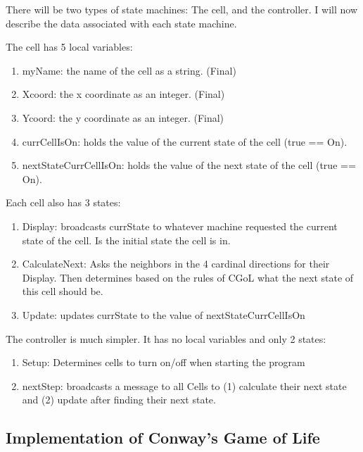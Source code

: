 There will be two types of state machines: The cell, and the controller.
I will now describe the data associated with each state machine.

The cell has 5 local variables:
\begin{enumerate}[leftmargin=4\parindent]
    \item myName: the name of the cell as a string. (Final)
    \item Xcoord: the x coordinate as an integer. (Final)
    \item Ycoord: the y coordinate as an integer. (Final)
    \item currCellIsOn: holds the value of the current state of the cell (true == On).
    \item nextStateCurrCellIsOn: holds the value of the next state of the cell (true == On).
\end{enumerate}

Each cell also has 3 states: 
\begin{enumerate}[leftmargin=4\parindent]
    \item Display: broadcasts currState to whatever machine requested the current state of the cell.
    Is the initial state the cell is in.
    \item CalculateNext: Asks the neighbors in the 4 cardinal directions for their Display.
    Then determines based on the rules of CGoL what the next state of this cell should be.
    \item Update: updates currState to the value of nextStateCurrCellIsOn
\end{enumerate}

The controller is much simpler.
It has no local variables and only 2 states:

\begin{enumerate}[leftmargin=4\parindent]
    \item Setup: Determines cells to turn on/off when starting the program
    \item nextStep: broadcasts a message to all Cells to (1) calculate their next state and (2) update after finding their next state.
\end{enumerate}

\subsection{Implementation of Conway's Game of Life}

